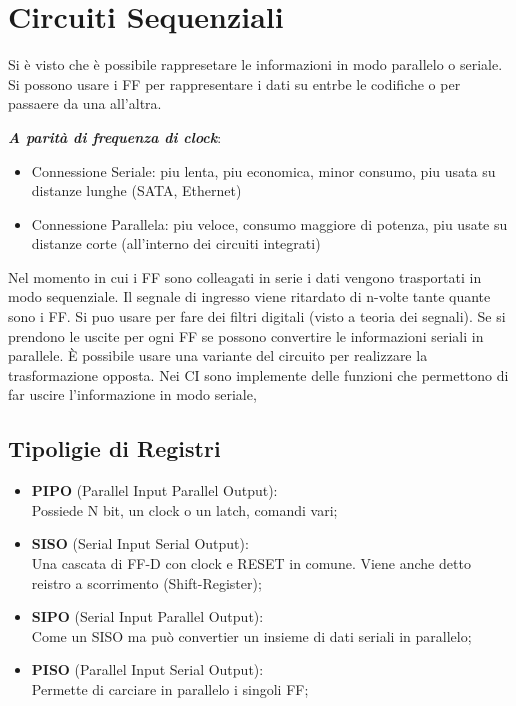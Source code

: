 \documentclass[12pt]{article}
\begin{document}
\newpage
\section{Circuiti Sequenziali}
Si \`e visto che \`e possibile rappresetare le informazioni in modo parallelo o seriale. Si possono usare i FF per rappresentare i dati su entrbe le codifiche o per passaere da una all'altra.

\textbf{\emph{A parit\`a di frequenza di clock}}:
\begin{itemize}
    \item Connessione Seriale: piu lenta, piu economica, minor consumo, piu usata su distanze lunghe (SATA, Ethernet)
    \item Connessione Parallela: piu veloce, consumo maggiore di potenza, piu usate su distanze corte (all'interno dei circuiti integrati)
\end{itemize}

Nel momento in cui i FF sono colleagati in serie i dati vengono trasportati in modo sequenziale. Il segnale di ingresso viene ritardato di n-volte tante quante sono i FF. Si puo usare per fare dei filtri digitali (visto a teoria dei segnali). Se si prendono le uscite per ogni FF se possono convertire le informazioni seriali in parallele. \`E possibile usare una variante del circuito per realizzare la trasformazione opposta. Nei CI sono implemente delle funzioni che permettono di far uscire l'informazione in modo seriale,

\subsection{Tipoligie di Registri}
\begin{itemize}
    \item \textbf{PIPO} (Parallel Input Parallel Output): \\
        Possiede N bit, un clock o un latch, comandi vari;
    \item \textbf{SISO} (Serial Input Serial Output): \\
        Una cascata di FF-D con clock e RESET in comune. Viene anche detto reistro a scorrimento (Shift-Register);
    \item \textbf{SIPO} (Serial Input Parallel Output): \\
        Come un SISO ma pu\`o convertier un insieme di dati seriali in parallelo;
    \item \textbf{PISO} (Parallel Input Serial Output): \\
        Permette di carciare in parallelo i singoli FF;
\end{itemize}
\end{document}

